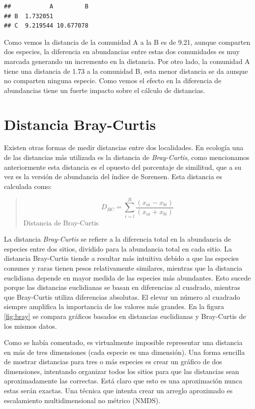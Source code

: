 \documentclass[]{book}
\begin{document}
\begin{verbatim}
##           A         B
## B  1.732051          
## C  9.219544 10.677078
\end{verbatim}

Como vemos la distancia de la comunidad A a la B es de 9.21, aunque
comparten dos especies, la diferencia en abundancias entre estas dos
comunidades es muy marcada generando un incremento en la distancia. Por
otro lado, la comunidad A tiene una distancia de 1.73 a la comunidad B,
esta menor distancia se da aunque no comparten ninguna especie. Como
vemos el efecto en la diferencia de abundancias tiene un fuerte impacto
sobre el cálculo de distancias.

\section{Distancia Bray-Curtis}\label{distancia-bray-curtis}

Existen otras formas de medir distancias entre dos localidades. En
ecología una de las distancias más utilizada es la distancia de
\emph{Bray-Curtis}, como mencionamos anteriormente esta distancia es el
opuesto del porcentaje de similitud, que a su vez es la versión de
abundancia del índice de Sorensen. Esta distancia es calculada como:

\begin{quote}
\[D_{BC} = \sum_{i=l}^R \frac{(x_{ai} - x_{bi})}{(x_{ai} + x_{bi})}\]
Distancia de Bray-Curtis
\end{quote}

La distancia \emph{Bray-Curtis} se refiere a la diferencia total en la
abundancia de especies entre dos sitios, dividido para la abundancia
total en cada sitio. La distancia Bray-Curtis tiende a resultar más
intuitiva debido a que las especies comunes y raras tienen pesos
relativamente similares, mientras que la distancia euclidiana depende en
mayor medida de las especies más abundantes. Esto sucede porque las
distancias euclidianas se basan en diferencias al cuadrado, mientras que
Bray-Curtis utiliza diferencias absolutas. El elevar un número al
cuadrado siempre amplifica la importancia de los valores más grandes. En
la figura \ref{fig:bray} se compara gráficos basados en distancias
euclidianas y Bray-Curtis de los mismos datos.

Como se había comentado, es virtualmente imposible representar una
distancia en más de tres dimensiones (cada especie es una dimensión).
Una forma sencilla de mostrar distancias para tres o más especies es
crear un gráfico de dos dimensiones, intentando organizar todos los
sitios para que las distancias sean aproximadamente las correctas. Está
claro que esto es una aproximación nunca estas serán exactas. Una
técnica que intenta crear un arreglo aproximado es escalamiento
multidimensional no métrico (NMDS).
\end{document}
